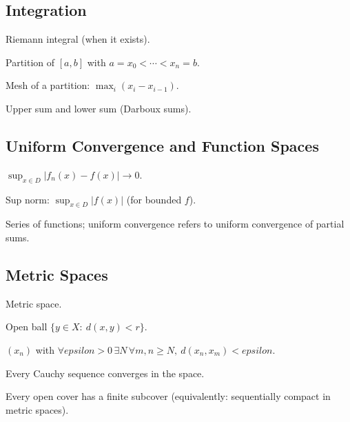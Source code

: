 \documentclass[12pt]{article}
\numberwithin{equation}{section}
\def\eps{epsilon}
\def\diff{d}
\newcommand{\eps}{\varepsilon}               %
\newcommand{\diff}{\mathop{}\!\mathrm{d}}    %
\theoremstyle{plain}
\theoremstyle{definition}
\theoremstyle{remark}
\begin{document}
\subsection{Integration}

\begin{description}[leftmargin=3.2cm,labelsep=0.6cm]
\item[$\int_a^b f(x)\,\diff x$] Riemann integral (when it exists).
\item[$P=\{x_0,\dots,x_n\}$] Partition of $[a,b]$ with $a=x_0<\cdots<x_n=b$.
\item[$\|P\|$] Mesh of a partition: $\max_i (x_i-x_{i-1})$.
\item[$U(f,P)$, $L(f,P)$] Upper sum and lower sum (Darboux sums).
\end{description}

\subsection{Uniform Convergence and Function Spaces}

\begin{description}[leftmargin=3.2cm,labelsep=0.6cm]
\item[$f_n\to f$ uniformly on $D$] $\sup_{x\in D}|f_n(x)-f(x)|\to 0$.
\item[$\|f\|_{\infty,D}$] Sup norm: $\sup_{x\in D}|f(x)|$ (for bounded $f$).
\item[$\sum_{n=1}^\infty f_n$] Series of functions; uniform convergence refers to uniform convergence of partial sums.
\end{description}

\subsection{Metric Spaces}

\begin{description}[leftmargin=3.2cm,labelsep=0.6cm]
\item[$(X,d)$] Metric space.
\item[$B(x,r)$] Open ball $\{y\in X:\ d(x,y)<r\}$.
\item[Cauchy sequence] $(x_n)$ with $\forall\eps>0\,\exists N\,\forall m,n\ge N,\ d(x_n,x_m)<\eps$.
\item[Complete] Every Cauchy sequence converges in the space.
\item[Compact] Every open cover has a finite subcover (equivalently: sequentially compact in metric spaces).
\end{description}

\newpage
\end{document}
